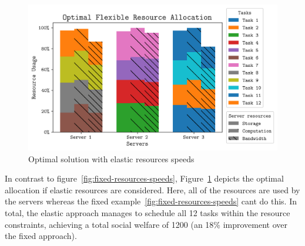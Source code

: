 \begin{figure}[th]
    \centering
    \includegraphics[width=\linewidth]{figs/allocation/optimal_flexible_resource_allocation.png}
    \caption{Optimal solution with elastic resources speeds}
    \label{fig:flexible-resources-speeds}
\end{figure}

In contrast to figure~\ref{fig:fixed-resources-speeds}, Figure~\ref{fig:flexible-resources-speeds} depicts the optimal
allocation if elastic resources are considered. Here, all of the resources are used by the servers whereas the fixed
example~\ref{fig:fixed-resources-speeds} cant do this. In total, the elastic approach manages to schedule all 12 tasks
within the resource constraints, achieving a total social welfare of 1200 (an 18\% improvement over the fixed approach).